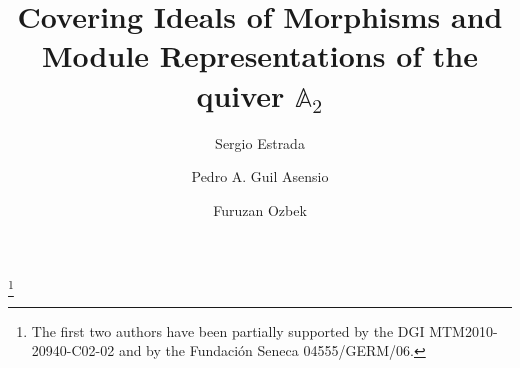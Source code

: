 \documentclass[11pt]{amsart}
\begin{document}
\title{Covering Ideals of Morphisms and Module Representations of the quiver $\mathbb{A}_2$}
\author{Sergio Estrada}
\address{Departamento de Matem\'atica Aplicada, Universidad de Murcia, 30100 Murcia, Spain}

\author{Pedro A. Guil Asensio}
\address{Departamento de Matem\'aticas, Universidad de Murcia, 30100 Murcia, Spain}

\author{Furuzan Ozbek}
\address{Department of Mathematics, University of Kentucky, 40506 Lexington, Kentucky, USA}

\thanks{The first two authors have been partially supported by the DGI
MTM2010-20940-C02-02 and by
the
Fundaci\'on Seneca 04555/GERM/06. }
\date{}

\end{document}
